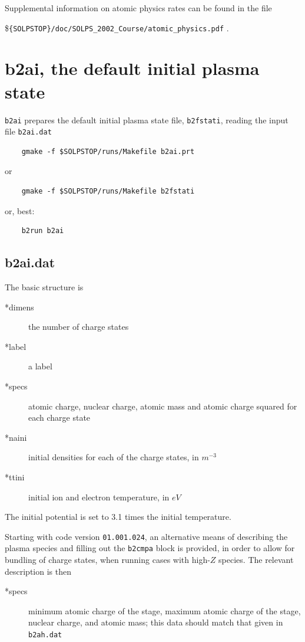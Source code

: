 \documentclass[a4paper,10pt]{report}
\begin{document}
Supplemental information on atomic physics rates can be found in the file

\${\tt \{SOLPSTOP\}/doc/SOLPS\_2002\_Course/atomic\_physics.pdf} .

\newpage
\section{b2ai, the default initial plasma state}
\label{sec:b2ai}

{\tt b2ai} prepares the default initial plasma state file, {\tt b2fstati},
reading the input file {\tt b2ai.dat}

\begin{verbatim}
    gmake -f $SOLPSTOP/runs/Makefile b2ai.prt
\end{verbatim}
or
\begin{verbatim}
    gmake -f $SOLPSTOP/runs/Makefile b2fstati
\end{verbatim}
or, best:
\begin{verbatim}
    b2run b2ai
\end{verbatim}

\subsection{b2ai.dat}


The basic structure is
\begin{description}
\item[*dimens] the number of charge states
\item[*label] a label
\item[*specs] atomic charge, nuclear charge, atomic mass and atomic
  charge squared for each charge state
\item[*naini] initial densities for each of the charge states, in $m^{-3}$
\item[*ttini] initial ion and electron temperature, in $eV$
\end{description}

The initial potential is set to 3.1 times the initial temperature.

Starting with code version {\tt 01.001.024}, an alternative means of
describing the plasma species and filling out the {\tt b2cmpa} block
is provided, in order to allow for bundling of charge states, when
running cases with high-$Z$ species. The relevant description is then
\begin{description}
\item[*specs] minimum atomic charge of the stage, maximum atomic charge
  of the stage, nuclear charge, and atomic mass; this data should match
  that given in {\tt b2ah.dat}
\end{description}
\end{document}
